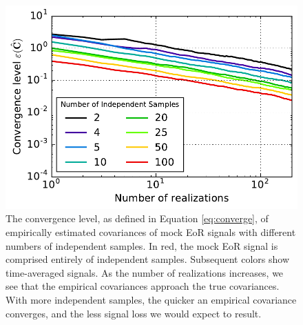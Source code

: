 \documentclass[preprint2,numberedappendix,tighten]{aastex6}  %
\begin{document}
\begin{figure}
	\centering
	\includegraphics[width=\columnwidth]{plots/toy_sigloss16.pdf}
	\caption{The convergence level, as defined in Equation \eqref{eq:converge}, of empirically estimated covariances of mock EoR signals with different numbers of independent samples. In red, the mock EoR signal is comprised entirely of independent samples. Subsequent colors show time-averaged signals. As the number of realizations increases, we see that the empirical covariances approach the true covariances. With more independent samples, the quicker an empirical covariance converges, and the less signal loss we would expect to result.}
	\label{fig:toy_sigloss16}
\end{figure}
\end{document}
